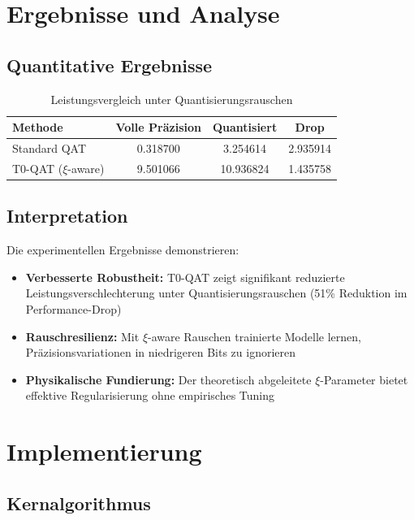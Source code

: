 	\section{Ergebnisse und Analyse}
	
	\subsection{Quantitative Ergebnisse}
	
	\begin{table}[h]
		\centering
		\begin{tabular}{lccc}
			\toprule
			\textbf{Methode} & \textbf{Volle Präzision} & \textbf{Quantisiert} & \textbf{Drop} \\
			\midrule
			Standard QAT & 0.318700 & 3.254614 & 2.935914 \\
			T0-QAT ($\xi$-aware) & 9.501066 & 10.936824 & 1.435758 \\
			\bottomrule
		\end{tabular}
		\caption{Leistungsvergleich unter Quantisierungsrauschen}
		\label{tab:results}
	\end{table}
	
	\subsection{Interpretation}
	
	Die experimentellen Ergebnisse demonstrieren:
	
	\begin{itemize}
		\item \textbf{Verbesserte Robustheit:} T0-QAT zeigt signifikant reduzierte Leistungsverschlechterung unter Quantisierungsrauschen (51\% Reduktion im Performance-Drop)
		\item \textbf{Rauschresilienz:} Mit $\xi$-aware Rauschen trainierte Modelle lernen, Präzisionsvariationen in niedrigeren Bits zu ignorieren
		\item \textbf{Physikalische Fundierung:} Der theoretisch abgeleitete $\xi$-Parameter bietet effektive Regularisierung ohne empirisches Tuning
	\end{itemize}
	
	\section{Implementierung}
	
	\subsection{Kernalgorithmus}
	
